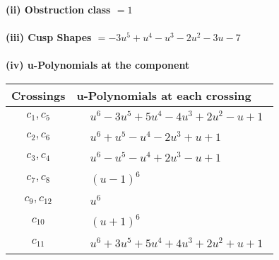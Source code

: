 \documentclass[1p]{elsarticle_modified}
\theoremstyle{definition}
\begin{document}
\flushleft \textbf{(ii) Obstruction class $= 1$}\\~\\
\flushleft \textbf{(iii) Cusp Shapes $= -3 u^5+u^4- u^3-2 u^2-3 u-7$}\\~\\
\newpage\renewcommand{\arraystretch}{1}
\flushleft \textbf{(iv) u-Polynomials at the component}\newline \\
\begin{tabular}{m{50pt}|m{274pt}}
Crossings & \hspace{64pt}u-Polynomials at each crossing \\
\hline $$\begin{aligned}c_{1},c_{5}\end{aligned}$$&$\begin{aligned}
&u^6-3 u^5+5 u^4-4 u^3+2 u^2- u+1
\end{aligned}$\\
\hline $$\begin{aligned}c_{2},c_{6}\end{aligned}$$&$\begin{aligned}
&u^6+u^5- u^4-2 u^3+u+1
\end{aligned}$\\
\hline $$\begin{aligned}c_{3},c_{4}\end{aligned}$$&$\begin{aligned}
&u^6- u^5- u^4+2 u^3- u+1
\end{aligned}$\\
\hline $$\begin{aligned}c_{7},c_{8}\end{aligned}$$&$\begin{aligned}
&(u-1)^6
\end{aligned}$\\
\hline $$\begin{aligned}c_{9},c_{12}\end{aligned}$$&$\begin{aligned}
&u^6
\end{aligned}$\\
\hline $$\begin{aligned}c_{10}\end{aligned}$$&$\begin{aligned}
&(u+1)^6
\end{aligned}$\\
\hline $$\begin{aligned}c_{11}\end{aligned}$$&$\begin{aligned}
&u^6+3 u^5+5 u^4+4 u^3+2 u^2+u+1
\end{aligned}$\\
\hline
\end{tabular}\\~\\
\end{document}
